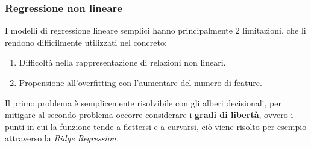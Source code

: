 \subsubsection{Regressione non lineare}
\fancyhead{}    %
\label{paragrafo 4.2.2}
I modelli di regressione lineare semplici hanno principalmente 2 limitazioni, che li
rendono difficilmente utilizzati nel concreto:
\begin{enumerate}
    \item Difficoltà nella rappresentazione di relazioni non lineari.
    \item Propensione all'overfitting con l'aumentare del numero di feature.
\end{enumerate}
Il primo problema è semplicemente risolvibile con gli alberi decisionali, per mitigare al
secondo problema occorre considerare i \textbf{gradi di libertà}, ovvero i punti in cui la funzione
tende a flettersi e a curvarsi, ciò viene risolto per esempio attraverso la \textit{Ridge Regression.}